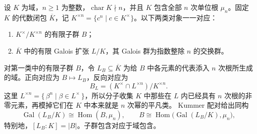 \begin{theorem}[Kummer 对应]\label{b1:thm:kummer-correspondence}
	设 \(K\) 为域，\(n\geq1\) 为整数，\(\operatorname{char}K\nmid n\)，并且 \(K\) 包含全部 \(n\) 次单位根 \(\mu_n\)。固定 \(K\) 的代数闭包 \(\overline K\)，记 \(K^{\times n}=\{c^n\mid c\in K^\times\}\)。以下两类对象一一对应：
	\begin{enumerate}
		\item \(K^\times/K^{\times n}\) 的有限子群 \(B\)；
		\item \(\overline K\) 中的有限 Galois 扩张 \(L/K\)，其 Galois 群为指数整除 \(n\) 的交换群。
	\end{enumerate}
	对第一类中的有限子群 \(B\)，令 \(L_B\subseteq\overline K\) 为给 \(B\) 中各元素的代表添入 \(n\) 次根所生成的域。正向对应为 \(B\mapsto L_B\)，反向对应为
	\[
		B_L=\left(K^\times\cap L^{\times n}\right)/K^{\times n}.
	\]
	这里 \(L^{\times n}=\{\,\beta^n\mid\beta\in L^\times\,\}\)，所以分子收集 \(K\) 中那些在 \(L\) 内已经具有 \(n\) 次根的非零元素，再模掉它们在 \(K\) 中本来就是 \(n\) 次幂的平凡类。 Kummer 配对给出同构
	\[
		\operatorname{Gal}(L_B/K)\cong\operatorname{Hom}(B,\mu_n), \qquad B\cong\operatorname{Hom}\bigl(\operatorname{Gal}(L_B/K),\mu_n\bigr),
	\]
	特别地，\([L_B:K]=|B|\)。子群包含对应于域包含。
\end{theorem}
